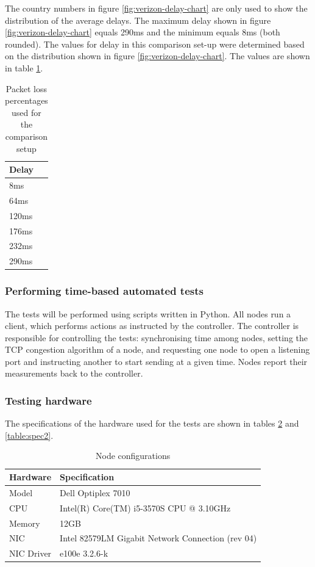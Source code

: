 \documentclass{article}
\begin{document}
The country numbers in figure \ref{fig:verizon-delay-chart} are only used to show the distribution of the average delays. The maximum delay shown in figure \ref{fig:verizon-delay-chart} equals 290ms and the minimum equals 8ms (both rounded). The values for delay in this comparison set-up were determined based on the distribution shown in figure \ref{fig:verizon-delay-chart}. The values are shown in table \ref{table:test-delay}.

\begin{table}[H]
	\centering
	\caption{Packet loss percentages used for the comparison setup}
	\begin{tabular}[H]{ | l |}
	\hline
	\textbf{Delay} \\
	\hline  8ms\\
	\hline  64ms  \\
	\hline  120ms  \\
	\hline  176ms \\
	\hline	232ms \\
	\hline  290ms  \\
	\hline
	\end{tabular}
	\label{table:test-delay}
\end{table}


\subsubsection{Performing time-based automated tests}

The tests will be performed using scripts written in Python\cite{git-lsproj}.
All nodes run a client, which performs actions as instructed by the controller.
The controller is responsible for controlling the tests: synchronising time
among nodes, setting the TCP congestion algorithm of a node, and requesting one
node to open a listening port and instructing another to start sending at a
given time. Nodes report their measurements back to the controller.

\subsubsection{Testing hardware}

The specifications of the hardware used for the tests are shown in tables \ref{table:spec1} and \ref{table:spec2}.

\begin{table}[H]
	\centering
	\caption{Node configurations}
	\begin{tabular}[H]{ | l | l | }
	\hline
	\textbf{Hardware} & \textbf{Specification} \\
	\hline  Model & Dell Optiplex 7010\\
	\hline  CPU & Intel(R) Core(TM) i5-3570S CPU @ 3.10GHz\\
	\hline  Memory & 12GB\\
	\hline  NIC & Intel 82579LM Gigabit Network Connection (rev 04)\\
	\hline	NIC Driver & e100e 3.2.6-k\\
	\hline
	\end{tabular}
	\label{table:spec1}
\end{table}
\end{document}
